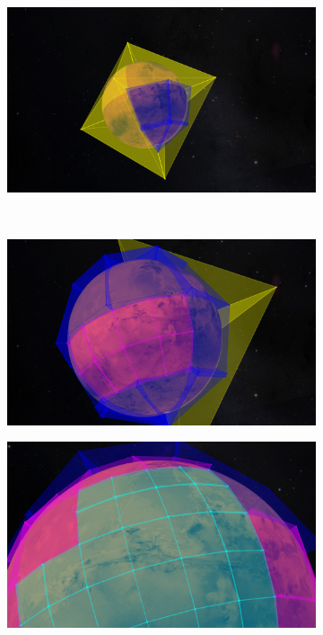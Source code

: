 \begin{figure}[h]
    \centering
    \begin{subfigure}[bt]{0.45\textwidth}
        \includegraphics[width=\textwidth]{figures/results/screenshots_thesis_old/bounds1.jpg}
        \caption{}
        \label{fig:tetrahedrablocks}
    \end{subfigure}
    ~
    \begin{subfigure}[bt]{0.45\textwidth}
        \includegraphics[width=\textwidth]{figures/results/screenshots_thesis_old/bounds2.jpg}
        \caption{}
    \end{subfigure}
    \begin{subfigure}[bt]{0.45\textwidth}
        \includegraphics[width=\textwidth]{figures/results/screenshots_thesis_old/bounds3.jpg}

\end{subfigure}
\end{figure}

